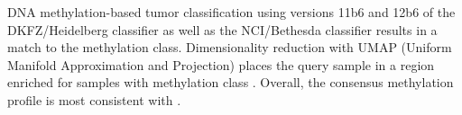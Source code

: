 DNA methylation-based tumor classification using versions 11b6 and 12b6 of the DKFZ/Heidelberg classifier as well as the NCI/Bethesda classifier results in a  match to the  methylation class.
Dimensionality reduction with UMAP (Uniform Manifold Approximation and Projection) places the query sample in a region enriched for samples with methylation class .
Overall, the consensus methylation profile is most consistent with .
